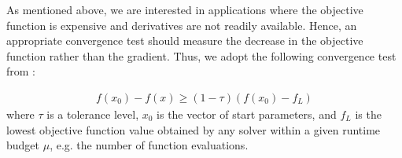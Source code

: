 \noindent As mentioned above, we are interested in applications where the objective function is expensive and derivatives are not readily available. Hence, an appropriate convergence test should measure the decrease in the objective function rather than the gradient.
Thus, we adopt the following convergence test from \cite{MoreWild2009}:


\begin{align}
        f(x_0) - f(x) \geq (1 - \tau)(f(x_0) - f_L)
        \label{eq:benchmarking-convergence-test}
\end{align}
where $\tau$ is a tolerance level, $x_0$ is the vector of start parameters, and $f_L$ is the lowest objective function value obtained by any solver within a given runtime budget $\mu$, e.g. the number of function evaluations.

